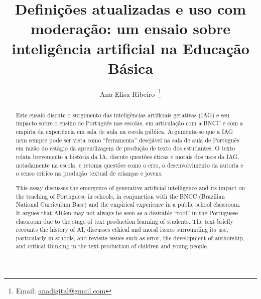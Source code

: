 \documentclass[portuguese]{textolivre}
\title{Definições atualizadas e uso com moderação: um ensaio sobre inteligência artificial na Educação Básica}
\author[1]{Ana Elisa Ribeiro~\orcid{0000-0002-4422-7480}\thanks{Email: \href{mailto: anadigital@gmail.com}{anadigital@gmail.com}}}
\affil[1]{Centro Federal de Educação Tecnológica de Minas Gerais (CEFET-MG), Departamento de Linguagem e Tecnologia, Belo Horizonte, MG, Brasil.}
\begin{document}
\maketitle

\begin{polyabstract}
\begin{abstract}
Este ensaio discute o surgimento das inteligências artificiais gerativas (IAG) e seu impacto sobre o ensino de Português nas escolas, em articulação com a BNCC e com a empiria da experiência em sala de aula na escola pública. Argumenta-se que a IAG nem sempre pode ser vista como ``ferramenta'' desejável na sala de aula de Português em razão do estágio da aprendizagem de produção de texto dos estudantes. O texto relata brevemente a história da IA, discute questões éticas e morais dos usos da IAG, notadamente na escola, e retoma questões como o erro, o desenvolvimento da autoria e o senso crítico na produção textual de crianças e jovens.

\end{abstract}

\begin{english}
\begin{abstract}
This essay discusses the emergence of generative artificial intelligence and its impact on the teaching of Portuguese in schools, in conjunction with the BNCC (Brazilian National Curriculum Base) and the empirical experience in a public school classroom. It argues that AIGen may not always be seen as a desirable ``tool'' in the Portuguese classroom due to the stage of text production learning of students. The text briefly recounts the history of AI, discusses ethical and moral issues surrounding its use, particularly in schools, and revisits issues such as error, the development of authorship, and critical thinking in the text production of children and young people.

\end{abstract}
\end{english}
\end{polyabstract}
\end{document}
